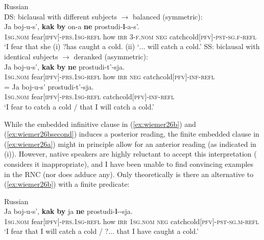\documentclass[output=paper,colorlinks,citecolor=brown]{langscibook}
\begin{document}
\newpage
\ea \textnormal{Russian} \\
\label{ex:wiemer26} 
\ea \label{ex:wiemer26a} \textnormal{DS: biclausal with different subjects $\rightarrow$ balanced (symmetric):} \\
\gll Ja boj-u-s', \textbf{kak} \textbf{by} on-a \textbf{ne} prostudi-\textbf{l}-a-s'. \\
\textsc{1sg.nom} fear\textsc{[ipfv]-prs.1sg-refl} how \textsc{irr} 3-\textsc{f.nom} \textsc{neg} catch\textunderscore cold\textsc{[pfv]-pst-sg.f-refl} \\
\glt `I fear that she (i) ?has caught a cold. (ii) `$\ldots$ will catch a cold.'
\ex \label{ex:wiemer26b} \textnormal{SS: biclausal with identical subjects $\rightarrow$ deranked (asymmetric):} \\
\gll Ja boj-u-s', \textbf{kak} \textbf{by} \textbf{ne} prostudi-t'-sja. \\
\textsc{1sg.nom} fear\textsc{[ipfv]-prs.1sg-refl} how \textsc{irr} \textsc{neg} catch\textunderscore cold\textsc{[pfv]-inf-refl} \\
\ex \label{ex:wiemer26bsecond}
\gll = Ja boj-u-s' prostudi-t'-sja. \\
{} \textsc{1sg.nom} fear\textsc{[ipfv]-prs.1sg-refl} catch\textunderscore cold\textsc{[pfv]-inf-refl} \\
\glt `I fear to catch a cold / that I will catch a cold.'
\z
\z


\noindent While the embedded infinitive clause in (\ref{ex:wiemer26b}) and (\ref{ex:wiemer26bsecond}) induces a posterior reading, the finite embedded clause in (\ref{ex:wiemer26a}) might in principle allow for an anterior reading (as indicated in (i)). However, native speakers are highly reluctant to accept this interpretation (\citealt[282]{Dobrushina2016} considers it inappropriate), and I have been unable to find convincing examples in the RNC (nor does \citealt{Nilsson2012} adduce any). Only theoretically is there an alternative to (\ref{ex:wiemer26b}) with a finite predicate:


\ea 
\label{ex:wiemer26c} \textnormal{Russian} \\
\gll Ja boj-u-s', \textbf{kak} \textbf{by} ja \textbf{ne} prostudi-\textbf{l}-\emptyset-sja. \\
\textsc{1sg.nom} fear\textsc{[ipfv]-prs.1sg-refl} how \textsc{irr} \textsc{1sg.nom} \textsc{neg} catch\textunderscore cold\textsc{[pfv]-pst-sg.m-refl} \\
\glt `I fear that I will catch a cold / ?$\ldots$ that I have caught a cold.'
\z
\end{document}
